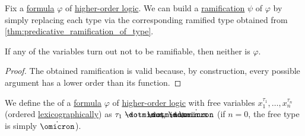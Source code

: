 \begin{proposition}\label{thm:predicative_ramification_of_formula}
  Fix a \hyperref[def:hol_term/formula]{formula} \( \varphi \) of \hyperref[def:higher_order_logic]{higher-order logic}. We can build a \hyperref[def:ramified_theory_of_types/formulas]{ramification} \( \psi \) of \( \varphi \) by simply replacing each type via the corresponding ramified type obtained from \cref{thm:predicative_ramification_of_type}.

  If any of the variables turn out not to be ramifiable, then neither is \( \varphi \).
\end{proposition}
\begin{proof}
  The obtained ramification is valid because, by construction, every possible argument has a lower order than its function.
\end{proof}

\begin{definition}\label{def:hol_formula_free_type}\mimprovised
  We define the  of a \hyperref[def:hol_term/formula]{formula} \( \varphi \) of \hyperref[def:higher_order_logic]{higher-order logic} with free variables \( x_1^{\tau_1}, \ldots, x_n^{\tau_n} \) (ordered \hyperref[def:lexicographic_order]{lexicographically}) as \( \tau_1 \synimplies \cdots \synimplies \tau_n \synimplies \syn\omicron \) (if \( n = 0 \), the free type is simply \( \syn\omicron \)).
\end{definition}

